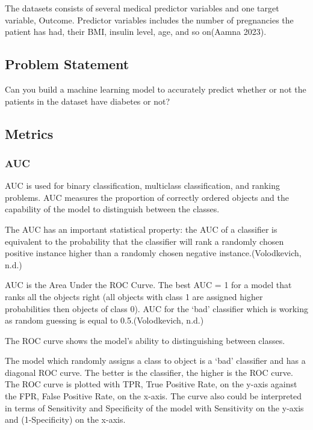 \documentclass[
]{article}
\begin{document}
The datasets consists of several medical predictor variables and one
target variable, Outcome. Predictor variables includes the number of
pregnancies the patient has had, their BMI, insulin level, age, and so
on(Aamna 2023).

\hypertarget{problem-statement}{%
\subsection{Problem Statement}\label{problem-statement}}

Can you build a machine learning model to accurately predict whether or
not the patients in the dataset have diabetes or not?

\hypertarget{metrics}{%
\subsection{Metrics}\label{metrics}}

\hypertarget{auc}{%
\subsubsection{AUC}\label{auc}}

AUC is used for binary classification, multiclass classification, and
ranking problems. AUC measures the proportion of correctly ordered
objects and the capability of the model to distinguish between the
classes.

The AUC has an important statistical property: the AUC of a classifier
is equivalent to the probability that the classifier will rank a
randomly chosen positive instance higher than a randomly chosen negative
instance.(Volodkevich, n.d.)

AUC is the Area Under the ROC Curve. The best AUC = 1 for a model that
ranks all the objects right (all objects with class 1 are assigned
higher probabilities then objects of class 0). AUC for the `bad'
classifier which is working as random guessing is equal to
0.5.(Volodkevich, n.d.)

The ROC curve shows the model's ability to distinguishing between
classes.

The model which randomly assigns a class to object is a `bad' classifier
and has a diagonal ROC curve. The better is the classifier, the higher
is the ROC curve. The ROC curve is plotted with TPR, True Positive Rate,
on the y-axis against the FPR, False Positive Rate, on the x-axis. The
curve also could be interpreted in terms of Sensitivity and Specificity
of the model with Sensitivity on the y-axis and (1-Specificity) on the
x-axis.
\end{document}
